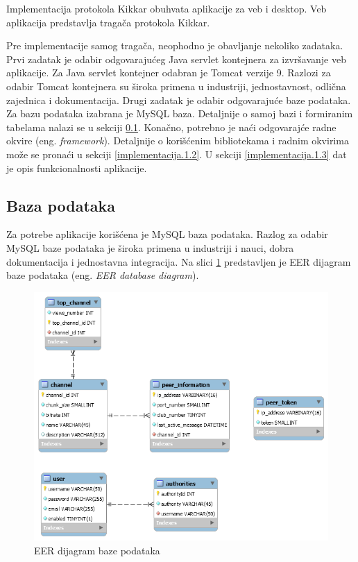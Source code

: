 \documentclass[12pt,oneside]{memoir}
\begin{document}
Implementacija protokola Kikkar obuhvata aplikacije za veb i desktop. Veb aplikacija predstavlja tragača protokola Kikkar. 

Pre implementacije samog tragača, neophodno je obavljanje nekoliko zadataka.
Prvi zadatak je odabir odgovarajućeg Java servlet kontejnera za izvršavanje veb aplikacije. Za Java servlet kontejner odabran je Tomcat \cite{Tomcat} verzije 9. Razlozi za odabir Tomcat kontejnera su široka primena u industriji, jednostavnost, odlična zajednica i dokumentacija. Drugi zadatak je odabir odgovarajuće baze podataka. Za bazu podataka izabrana je MySQL \cite{Mysql} baza. Detaljnije o samoj bazi i formiranim tabelama nalazi se u sekciji \ref{implementacija.1.1}. Konačno, potrebno je naći odgovarajće radne okvire (eng. \textit{framework}). Detaljnije o korišćenim bibliotekama i radnim okvirima može se pronaći u sekciji \ref{implementacija.1.2}. U sekciji \ref{implementacija.1.3} dat je opis funkcionalnosti aplikacije.

\subsection{Baza podataka}
\label{implementacija.1.1}

Za potrebe aplikacije korišćena je MySQL \cite{Mysql} baza podataka. Razlog za odabir MySQL baze podataka je široka primena u industriji i nauci, dobra dokumentacija i jednostavna integracija. Na slici \ref{fig:eer} predstavljen je EER dijagram baze podataka (eng. \textit{EER database diagram}). 

\begin{figure}[!ht]
  \centering
  \includegraphics[width=1.05\textwidth]{slike/eer-dijagram.png}
  \caption{EER dijagram baze podataka}
  \label{fig:eer}
\end{figure}
\par
\end{document}
